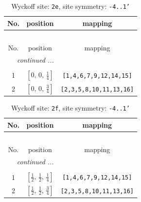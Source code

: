 \documentclass[fleqn,8pt]{jsarticle}
\begin{document}
\begin{longtable}{ccc}
\caption{Wyckoff site: {\tt 2e}, site symmetry: {\tt -4..1'}}
 \\
 \hline \hline
No. & position & mapping \\ \hline \endfirsthead

\multicolumn{2}{l}{\tablename\ \thetable{}} \\
 \hline \hline
No. & position & mapping \\ \hline \endhead

 \hline \hline
\multicolumn{2}{r}{\footnotesize\it continued ...} \\ \endfoot

 \hline \hline
\multicolumn{2}{r}{} \\ \endlastfoot

1 & $\left[ 0,\, 0,\, \frac{1}{4} \right]$ & {\tt [1,4,6,7,9,12,14,15]} \\ \hline
2 & $\left[ 0,\, 0,\, \frac{3}{4} \right]$ & {\tt [2,3,5,8,10,11,13,16]} \\
\end{longtable}
\renewcommand{\arraystretch}{1.2}
\begin{longtable}{ccc}
\caption{Wyckoff site: {\tt 2f}, site symmetry: {\tt -4..1'}}
 \\
 \hline \hline
No. & position & mapping \\ \hline \endfirsthead

\multicolumn{2}{l}{\tablename\ \thetable{}} \\
 \hline \hline
No. & position & mapping \\ \hline \endhead

 \hline \hline
\multicolumn{2}{r}{\footnotesize\it continued ...} \\ \endfoot

 \hline \hline
\multicolumn{2}{r}{} \\ \endlastfoot

1 & $\left[ \frac{1}{2},\, \frac{1}{2},\, \frac{1}{4} \right]$ & {\tt [1,4,6,7,9,12,14,15]} \\ \hline
2 & $\left[ \frac{1}{2},\, \frac{1}{2},\, \frac{3}{4} \right]$ & {\tt [2,3,5,8,10,11,13,16]} \\
\end{longtable}
\renewcommand{\arraystretch}{1.2}
\end{document}
